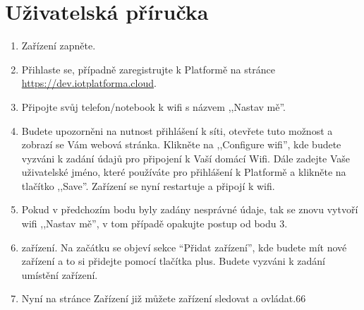 \chapter{Uživatelská příručka}\label{user-guide}
\begin{enumerate}
    \item Zařízení zapněte.
    \item Přihlaste se, případně zaregistrujte k Platformě na stránce \\
          \href{https://dev.iotplatforma.cloud}{https://dev.iotplatforma.cloud}.
    \item Připojte svůj telefon/notebook k wifi s názvem ,,Nastav mě”.
    \item Budete upozorněni na nutnost přihlášení k síti, otevřete tuto možnost a zobrazí se Vám webová stránka. Klikněte na ,,Configure wifi”, kde budete vyzváni k zadání údajů pro připojení k Vaší domácí Wifi. Dále zadejte Vaše uživatelské jméno, které používáte pro přihlášení k Platformě a klikněte na tlačítko ,,Save”. Zařízení se nyní restartuje a připojí k wifi.
    \item Pokud v předchozím bodu byly zadány nesprávné údaje, tak se znovu vytvoří wifi ,,Nastav mě”, v tom případě opakujte postup od bodu 3.
    \item zařízení. Na začátku se objeví sekce “Přidat zařízení”, kde budete mít nové zařízení a to si přidejte pomocí tlačítka plus. Budete vyzváni k zadání umístění zařízení.
    \item Nyní na stránce Zařízení již můžete zařízení sledovat a ovládat.66
\end{enumerate}